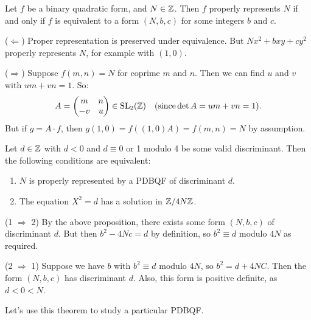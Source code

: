 \documentclass{article}
\begin{document}
\begin{proposition}
    Let $f$ be a binary quadratic form, and $N \in \mathbb{Z}$.
    Then $f$ properly represents $N$ if and only if $f$ is equivalent to a form $(N, b, c)$ for some integers $b$ and $c$.
\end{proposition}

\begin{prf}
    ($\Leftarrow$) Proper representation is preserved under equivalence. But $Nx^2 + bxy + cy^2$ properly represents $N$, for example with $(1, 0)$.
    
    ($\Rightarrow$) Suppose $f(m, n) = N$ for coprime $m$ and $n$. Then we can find $u$ and $v$ with $um + vn = 1$. So:
    \[
	A = \begin{pmatrix}
		m & n \\
		-v & u
	\end{pmatrix}
	\in \mathrm{SL}_2(\mathbb{Z})
	\quad
	(\text{since} \det A = um + vn = 1).
	\]
	But if $g = A \cdot f$, then $g(1, 0) = f((1, 0)A) = f(m, n) = N$ by assumption.
\end{prf}

\begin{theorem}
    Let $d \in \mathbb{Z}$ with $d < 0$ and $d \equiv 0$ or 1 modulo 4 be some valid discriminant. Then the following conditions are equivalent:
    \begin{enumerate}
	    \item $N$ is properly represented by a PDBQF of discriminant $d$.
	    \item The equation $X^2 = d$ has a solution in $\mathbb{Z}/4N\mathbb{Z}$.
	\end{enumerate}
\end{theorem}

\begin{prf}
    (1 $\Rightarrow$ 2) By the above proposition, there exists some form $(N, b, c)$ of discriminant $d$. But then $b^2 - 4Nc = d$ by definition, so $b^2 \equiv d$ modulo $4N$ as required.
    
    (2 $\Rightarrow$ 1) Suppose we have $b$ with $b^2 \equiv d$ modulo $4N$, so $b^2 = d + 4NC$. Then the form $(N, b, c)$ has discriminant $d$. Also, this form is positive definite, as $d < 0 < N$.
\end{prf}

Let's use this theorem to study a particular PDBQF.
\end{document}
